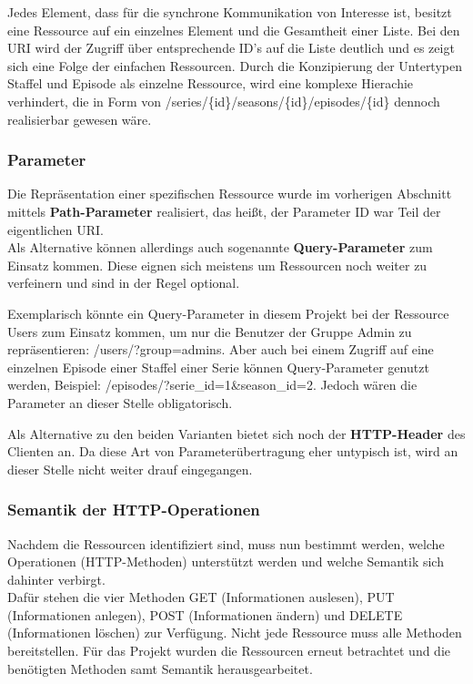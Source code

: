 \documentclass[a4paper]{article}
\begin{document}
Jedes Element, dass für die synchrone Kommunikation von Interesse ist, besitzt eine Ressource auf ein einzelnes Element und die Gesamtheit einer Liste. Bei den URI wird der Zugriff über entsprechende ID's auf die Liste deutlich und es zeigt sich eine Folge der einfachen Ressourcen. Durch die Konzipierung der Untertypen Staffel und Episode als einzelne Ressource, wird eine komplexe Hierachie verhindert, die in Form von /series/\{id\}/seasons/\{id\}/episodes/\{id\} dennoch realisierbar gewesen wäre.


\subsubsection{Parameter}

Die Repräsentation einer spezifischen Ressource wurde im vorherigen Abschnitt mittels \textbf{Path-Parameter} realisiert, das heißt, der Parameter ID war Teil der eigentlichen URI.\\
Als Alternative können allerdings auch sogenannte \textbf{Query-Parameter} zum Einsatz kommen. Diese eignen sich meistens um Ressourcen noch weiter zu verfeinern und sind in der Regel optional.

Exemplarisch könnte ein Query-Parameter in diesem Projekt bei der Ressource Users zum Einsatz kommen, um nur die Benutzer der Gruppe Admin zu repräsentieren: \textsf{/users/?group=admins}. Aber auch bei einem Zugriff auf eine einzelnen Episode einer Staffel einer Serie können Query-Parameter genutzt werden, Beispiel: \textsf{/episodes/?serie\_id=1\&season\_id=2}. Jedoch wären die Parameter an dieser Stelle obligatorisch.

Als Alternative zu den beiden Varianten bietet sich noch der \textbf{HTTP-Header} des Clienten an. Da diese Art von Parameterübertragung eher untypisch ist, wird an dieser Stelle nicht weiter drauf eingegangen.

\subsubsection{Semantik der HTTP-Operationen}

Nachdem die Ressourcen identifiziert sind, muss nun bestimmt werden, welche Operationen (HTTP-Methoden) unterstützt werden und welche Semantik sich dahinter verbirgt.\\
Dafür stehen die vier Methoden GET (Informationen auslesen), PUT (Informationen anlegen), POST (Informationen ändern) und DELETE (Informationen löschen) zur Verfügung. Nicht jede Ressource muss alle Methoden bereitstellen. Für das Projekt wurden die Ressourcen erneut betrachtet und die benötigten Methoden samt Semantik herausgearbeitet.
\end{document}

